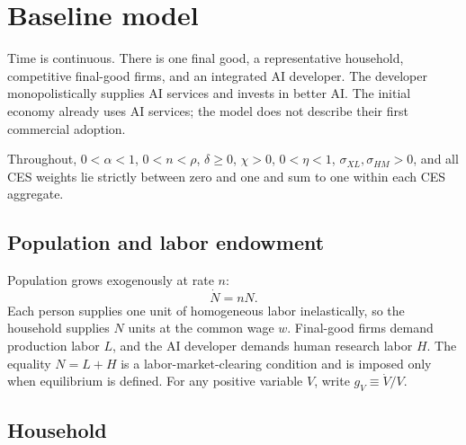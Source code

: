 \section{Baseline model}
\label{sec:axm-model}

Time is continuous. There is one final good, a representative household,
competitive final-good firms, and an integrated AI developer. The developer
monopolistically supplies AI services and invests in better AI. The initial
economy already uses AI services; the model does not describe their first
commercial adoption.


\begin{assumption}[Parameters]
Throughout, \(0<\alpha<1\), \(0<n<\rho\), \(\delta\geq0\),
\(\chi>0\), \(0<\eta<1\), \(\sigma_{XL},\sigma_{HM}>0\), and all CES
weights lie strictly between zero and one and sum to one within each CES
aggregate.
\end{assumption}

\subsection{Population and labor endowment}

Population grows exogenously at rate \(n\):
\begin{equation}
 \dot N=nN.
 \label{eq:axm-population}
\end{equation}
Each person supplies one unit of homogeneous labor inelastically, so the
household supplies \(N\) units at the common wage \(w\). Final-good firms demand
production labor \(L\), and the AI developer demands human research labor \(H\).
The equality \(N=L+H\) is a labor-market-clearing condition and is imposed only
when equilibrium is defined. For any positive variable \(V\), write
\(g_V\equiv\dot V/V\).

\subsection{Household}

